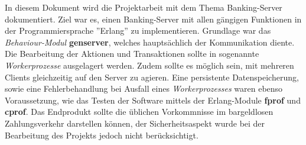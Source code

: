 In diesem Dokument wird die Projektarbeit mit dem Thema Banking-Server dokumentiert. Ziel war es, einen Banking-Server mit allen gängigen Funktionen in der Programmiersprache ''Erlang'' zu implementieren. Grundlage war das \textit{Behaviour-Modul} \textbf{gen\textunderscore server}, welches hauptsächlich der Kommunikation diente. Die Bearbeitung der Aktionen und Transaktionen sollte in sogenannte \textit{Workerprozesse} ausgelagert werden. Zudem sollte es möglich sein, mit mehreren Clients gleichzeitig auf den Server zu agieren. Eine persistente Datenspeicherung, sowie eine Fehlerbehandlung bei Ausfall eines \textit{Workerprozesses} waren ebenso Voraussetzung, wie das Testen der Software mittels der Erlang-Module \textbf{fprof} und \textbf{cprof}. Das Endprodukt sollte die üblichen Vorkommnisse im bargeldlosen Zahlungsverkehr darstellen können, der Sicherheitsaspekt wurde bei der Bearbeitung des Projekts jedoch nicht berücksichtigt.